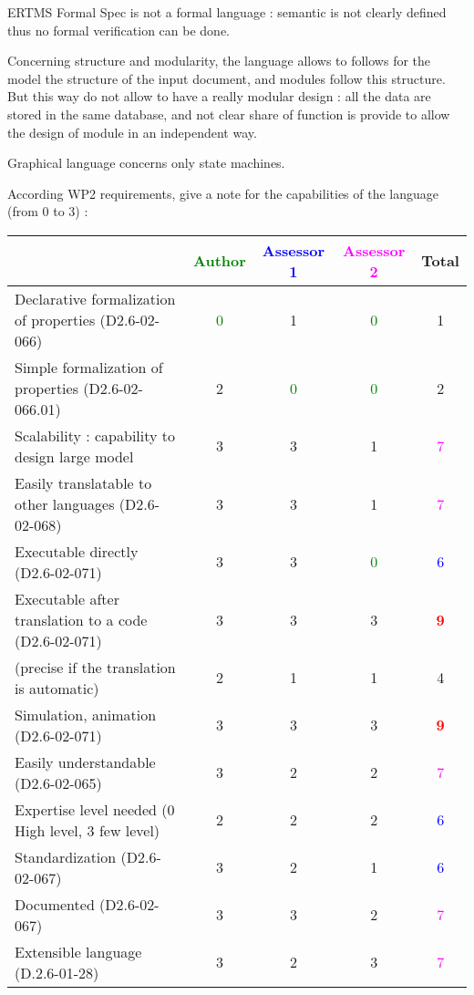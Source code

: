 \begin{assessor2}
ERTMS Formal Spec is not a formal language :  semantic is not clearly defined thus no formal verification can be done.

Concerning structure and modularity, the language allows to follows for the model the structure of the input document, and modules follow this structure. But this way do not allow to have a really modular design :  all the data are stored in the same database, and not clear share of function is provide to allow the design of module in an independent way.

Graphical language concerns only state machines.
\end{assessor2}

According WP2 requirements, give a note for the capabilities of the language (from 0 to 3) :

\begin{tabular}{|l | c | c | c | c|}
\hline
& \textcolor{green}{Author} & \textcolor{blue}{Assessor 1} & \textcolor{magenta}{Assessor 2} & Total \\
\hline
Declarative formalization of properties (D2.6-02-066) & \textcolor{green}{0} & 1     & \textcolor{green}{0} & 1     \\
\hline
Simple formalization of properties (D2.6-02-066.01) & 2     & \textcolor{green}{0} & \textcolor{green}{0} & 2     \\
\hline
Scalability : capability to design large model & 3     & 3     & 1     & \textcolor{magenta}{7} \\
\hline
Easily translatable to other languages (D2.6-02-068) & 3     & 3     & 1     & \textcolor{magenta}{7} \\
\hline
Executable directly (D2.6-02-071) & 3     & 3     & \textcolor{green}{0} & \textcolor{blue}{6} \\
\hline
Executable after translation to a code (D2.6-02-071) & 3     & 3     & 3     & \textcolor{red}{\textbf{9}} \\
(precise if the translation is automatic) & 2     & 1     & 1     & 4     \\
\hline
Simulation, animation (D2.6-02-071) & 3     & 3     & 3     & \textcolor{red}{\textbf{9}} \\
\hline
Easily understandable (D2.6-02-065) & 3     & 2     & 2     & \textcolor{magenta}{7} \\
\hline
Expertise level needed (0 High level, 3 few level) & 2     & 2     & 2     & \textcolor{blue}{6} \\
\hline
Standardization (D2.6-02-067) & 3     & 2     & 1     & \textcolor{blue}{6} \\
\hline
Documented (D2.6-02-067) & 3     & 3     & 2     & \textcolor{magenta}{7} \\
\hline
Extensible language (D.2.6-01-28) & 3     & 2     & 3     & \textcolor{magenta}{7} \\
\hline
\end{tabular}

